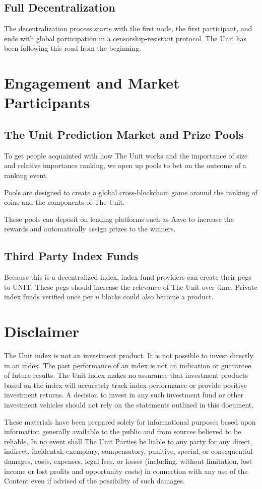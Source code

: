 \documentclass[12pt]{article}
\begin{document}
\subsection{Full Decentralization}

The decentralization process starts with the first node, the first participant, and ends with global participation in a censorship-resistant protocol. The Unit has been following this road from the beginning.

\section{Engagement and Market Participants}

\subsection{The Unit Prediction Market and Prize Pools}

To get people acquainted with how The Unit works and the importance of size and relative importance ranking, we open up pools to bet on the outcome of a ranking event.

Pools are designed to create a global cross-blockchain game around the ranking of coins and the components of The Unit.

These pools can deposit on lending platforms such as Aave to increase the rewards and automatically assign prizes to the winners.

\subsection{Third Party Index Funds}

Because this is a decentralized index, index fund providers can create their pegs to UNIT. These pegs should increase the relevance of The Unit over time. Private index funds verified once per $n$ blocks could also become a product. 


\section{Disclaimer}

The Unit index is not an investment product. It is not possible to invest directly in an index. The past performance of an index is not an indication or guarantee of future results. The Unit index makes no assurance that investment products based on the index will accurately track index performance or provide positive investment returns. A decision to invest in any such investment fund or other investment vehicles should not rely on the statements outlined in this document. 

These materials have been prepared solely for informational purposes based upon information generally available to the public and from sources believed to be reliable. In no event shall The Unit Parties be liable to any party for any direct, indirect, incidental, exemplary, compensatory, punitive, special, or consequential damages, costs, expenses, legal fees, or losses (including, without limitation, lost income or lost profits and opportunity costs) in connection with any use of the Content even if advised of the possibility of such damages.
\end{document}

